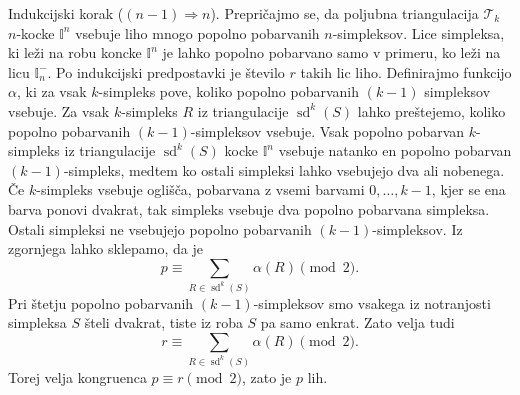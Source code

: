 \documentclass[mat1]{fmfdelo}
\DeclareMathOperator{\sd}{sd}
\newcommand{\I}{\mathbb I}
\newcommand{\0}{\underline{0}}
\newcommand{\pT}{\mathcal T}
\begin{document}
\begin{dokaz}
Indukcijski korak ($(n - 1) \Longrightarrow n$).
Prepričajmo se, da poljubna triangulacija $\pT_k$ $n$-kocke $\I^n$ vsebuje liho mnogo popolno pobarvanih $n$-simpleksov. Lice simpleksa, ki leži na robu koncke $\I^n$ je lahko popolno pobarvano samo v primeru, ko leži na licu $\I_n^-$. Po indukcijski predpostavki je število $r$ takih lic liho. 
Definirajmo funkcijo $\alpha$, ki za vsak $k$-simpleks pove, koliko popolno pobarvanih $(k-1)$ simpleksov vsebuje. Za vsak $k$-simpleks $R$ iz triangulacije $\sd^k(S)$ lahko preštejemo, koliko popolno pobarvanih $(k-1)$-simpleksov vsebuje. Vsak popolno pobarvan $k$-simpleks iz triangulacije $\sd^k(S)$ kocke $\I^n$ vsebuje natanko en popolno pobarvan $(k-1)$-simpleks, medtem ko ostali simpleksi lahko vsebujejo dva ali nobenega. Če $k$-simpleks vsebuje oglišča, pobarvana z vsemi barvami $0, \dots, k-1$, kjer se ena barva ponovi dvakrat, tak simpleks vsebuje dva popolno pobarvana simpleksa. Ostali simpleksi ne vsebujejo popolno pobarvanih $(k - 1)$-simpleksov. Iz zgornjega lahko sklepamo, da je 
$$p \equiv \sum\limits_{R \in \sd^k(S)} \alpha(R) \pmod 2.$$
Pri štetju popolno pobarvanih $(k - 1)$-simpleksov smo vsakega iz notranjosti simpleksa $S$ šteli dvakrat, tiste iz roba $S$ pa samo enkrat. Zato velja tudi 
$$r \equiv \sum\limits_{R \in \sd^k(S)} \alpha(R) \pmod 2.$$ 
Torej velja kongruenca $p \equiv r \pmod 2$, zato je $p$ lih.
\end{dokaz}
\end{document}
